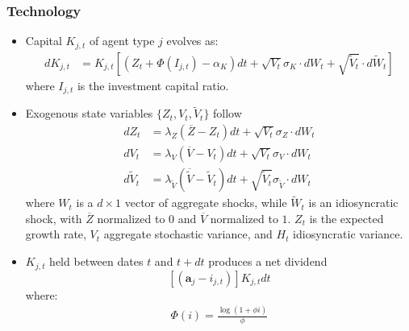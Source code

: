 \documentclass[12pt]{article}
\begin{document}
\subsubsection{Technology}

\begin{itemize}
\item Capital $K_{j,t}$ of agent type $j$ evolves as:
\begin{align*}
 dK_{j, 
 t} &= K_{j,t} \left[ \left( Z_t + \Phi(I_{j,t}) - \alpha_K \right)dt + \sqrt{V_t} \sigma_K \cdot dW_t + \sqrt{\widetilde{V}_t} \cdot d\widetilde{W}_t \right]  
\end{align*}
where $I_{j,t}$ is the investment capital ratio.  
\item Exogenous state variables $\{Z_t, V_t, \widetilde{V}_t\}$ follow
\begin{align*}
dZ_t &=   \lambda_Z (\overline{Z} - Z_{t})dt + \sqrt{V_{t}} \sigma_Z \cdot dW_t  \\
dV_{t} &= \lambda_{V} (\overline{V} - V_{t}) dt + \sqrt{V_{t}} \sigma_{V} \cdot dW_t \\
d\widetilde{V}_{t} &= \lambda_{\widetilde{V}} (\overline{\widetilde{V}} - \widetilde{V}_{t}) dt + \sqrt{\widetilde{V}_{t}} \sigma_{\widetilde{V}} \cdot dW_t 
\end{align*}
where $W_t$ is a $d \times 1$ vector of aggregate shocks, while $\widetilde{W}_t$ is an idiosyncratic shock, with $\overline{Z}$ normalized to $0$ and $\overline{V}$ normalized to $1$. $Z_t$ is the expected growth rate, $V_t$ aggregate stochastic variance, and $H_t$ idiosyncratic variance.
\item $K_{j,t}$ held between dates $t$ and $t + dt$  produces a net dividend
\[
\left[ \left( {\mathbf a}_j  - i_{j,t} \right) \right] K_{j,t} dt
\]
where:
\begin{align*}
 \Phi(i) = \frac{\log(1 + \phi i)}{\phi}
\end{align*}
\end{itemize}
\end{document}
